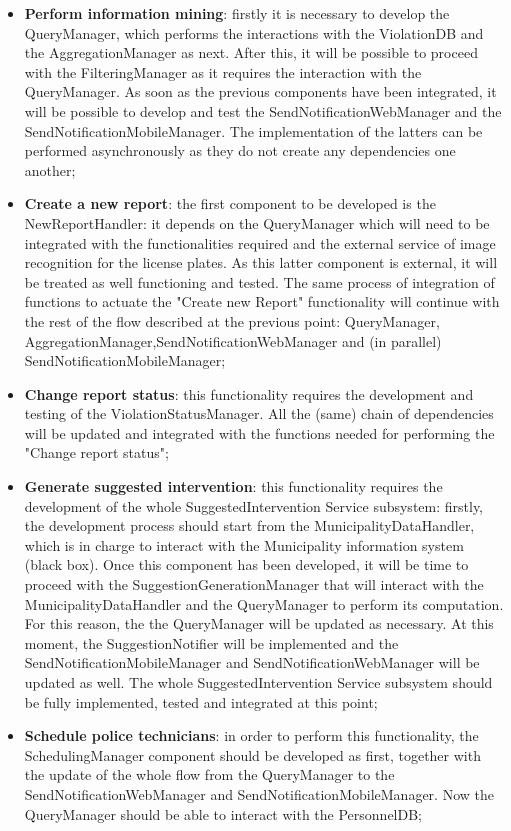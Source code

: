 \begin{itemize}
    \item \textbf{Perform information mining}: firstly it is necessary to develop the QueryManager, which performs the interactions with the ViolationDB and the AggregationManager as next. After this, it will be possible to proceed with the FilteringManager as it requires the interaction with the QueryManager. As soon as the previous components have been integrated, it will be possible to develop and test the
     SendNotificationWebManager and the SendNotificationMobileManager. The implementation of the latters can be performed asynchronously as they do not create any dependencies one another; 
    \item \textbf{Create a new report}: the first component to be developed is the NewReportHandler: it depends on the QueryManager which will need to be integrated with the functionalities required and the external service of image recognition for the license plates. As this latter component is external, it will be treated as well functioning and tested. The same process of integration of functions to actuate the "Create new Report" functionality will continue with the rest of the flow described at the previous point: QueryManager, AggregationManager,SendNotificationWebManager and (in parallel) SendNotificationMobileManager;
    \item \textbf{Change report status}: this functionality requires the development and testing of the ViolationStatusManager. All the (same) chain of dependencies will be updated and integrated with the functions needed for performing the "Change report status";
    \item \textbf{Generate suggested intervention}: this functionality requires the development of the whole SuggestedIntervention Service subsystem: firstly, the development process should start from the MunicipalityDataHandler, which is in charge to interact with the Municipality information system (black box). Once this component has been developed, it will be time to proceed with the SuggestionGenerationManager that will interact with the MunicipalityDataHandler and the QueryManager to perform its computation. For this reason, the the QueryManager will be updated as necessary. At this moment, the SuggestionNotifier will be implemented and the SendNotificationMobileManager and SendNotificationWebManager will be updated as well. The whole SuggestedIntervention Service subsystem should be fully implemented, tested and integrated at this point;
    \item \textbf{Schedule police technicians}: in order to perform this functionality, the SchedulingManager component should be developed as first, together with the update of the whole flow from the QueryManager to the SendNotificationWebManager and SendNotificationMobileManager. Now the QueryManager should be able to interact with the PersonnelDB;

\end{itemize}
